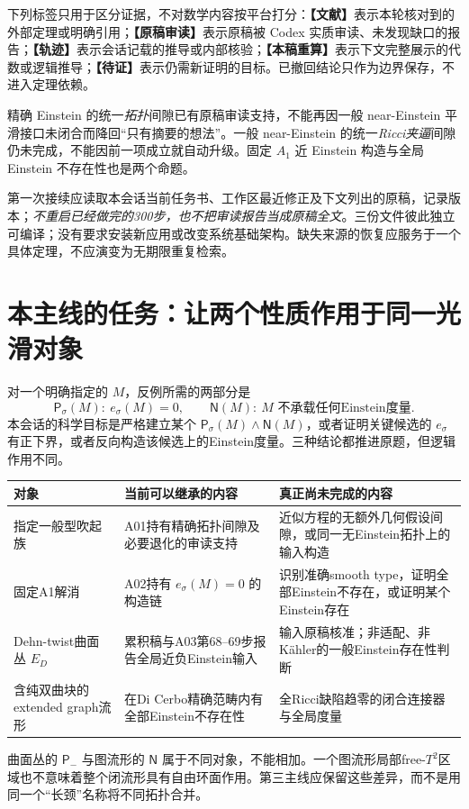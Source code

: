 \documentclass[UTF8,a4paper,11pt,fontset=fandol]{ctexart}
\numberwithin{equation}{section}
\theoremstyle{definition}
\newcommand{\status}[1]{\textbf{【#1】}}
\begin{document}
下列标签只用于区分证据，不对数学内容按平台打分：\status{文献}表示本轮核对到的外部定理或明确引用；\status{原稿审读}表示原稿被 Codex 实质审读、未发现缺口的报告；\status{轨迹}表示会话记载的推导或内部核验；\status{本稿重算}表示下文完整展示的代数或逻辑推导；\status{待证}表示仍需新证明的目标。已撤回结论只作为边界保存，不进入定理依赖。

精确 Einstein 的统一\emph{拓扑}间隙已有原稿审读支持，不能再因一般 near-Einstein 平滑接口未闭合而降回“只有摘要的想法”。一般 near-Einstein 的统一\emph{Ricci夹逼}间隙仍未完成，不能因前一项成立就自动升级。固定 $A_1$ 近 Einstein 构造与全局 Einstein 不存在性也是两个命题。

第一次接续应读取本会话当前任务书、工作区最近修正及下文列出的原稿，记录版本；\emph{不重启已经做完的300步，也不把审读报告当成原稿全文}。三份文件彼此独立可编译；没有要求安装新应用或改变系统基础架构。缺失来源的恢复应服务于一个具体定理，不应演变为无期限重复检索。

\section{本主线的任务：让两个性质作用于同一光滑对象}
对一个明确指定的 $M$，反例所需的两部分是
\[
\mathsf P_\sigma(M):\ e_\sigma(M)=0,
\qquad
\mathsf N(M):\ M\text{ 不承载任何Einstein度量}.
\]
本会话的科学目标是严格建立某个 $\mathsf P_\sigma(M)\land\mathsf N(M)$，或者证明关键候选的 $e_\sigma$ 有正下界，或者反向构造该候选上的Einstein度量。三种结论都推进原题，但逻辑作用不同。

\begin{longtable}{L{.22\textwidth}L{.34\textwidth}L{.35\textwidth}}
\toprule 对象 & 当前可以继承的内容 & 真正尚未完成的内容\\\midrule\endhead
指定一般型吹起族 & A01持有精确拓扑间隙及必要退化的审读支持 & 近似方程的无额外几何假设间隙，或同一无Einstein拓扑上的输入构造\\
固定A1解消 & A02持有 $e_\sigma(M)=0$ 的构造链 & 识别准确smooth type，证明全部Einstein不存在，或证明某个Einstein存在\\
Dehn-twist曲面丛 $E_D$ & 累积稿与A03第68--69步报告全局近负Einstein输入 & 输入原稿核准；非适配、非K\"ahler的一般Einstein存在性判断\\
含纯双曲块的extended graph流形 & 在Di Cerbo精确范畴内有全部Einstein不存在性 & 全Ricci缺陷趋零的闭合连接器与全局度量\\\bottomrule
\end{longtable}
曲面丛的 $\mathsf P_-$ 与图流形的 $\mathsf N$ 属于不同对象，不能相加。一个图流形局部free-$T^2$区域也不意味着整个闭流形具有自由环面作用。第三主线应保留这些差异，而不是用同一个“长颈”名称将不同拓扑合并。
\end{document}

